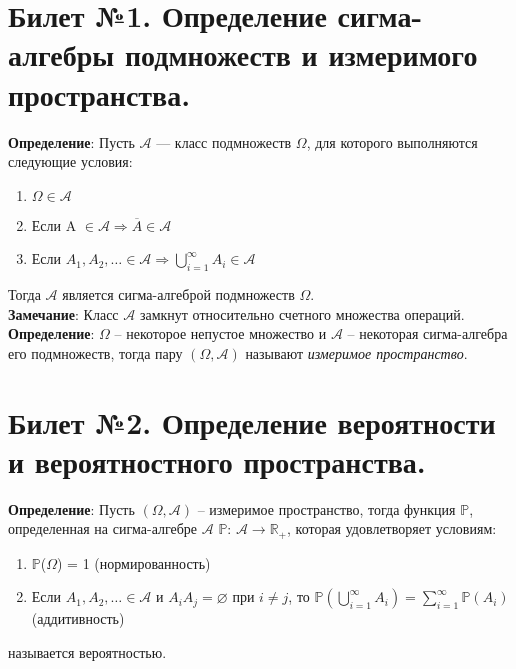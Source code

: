 




\newpage
\tableofcontents{} %
\newpage
	
\section{Билет №1. Определение сигма-алгебры подмножеств и измеримого пространства.}

\hspace*{\parindent} \textbf{Определение}:  Пусть $\mathscr{A}$ — класс подмножеств $\Omega$, для которого выполняются следующие условия:
\begin{enumerate}
	\item $\Omega \in \mathscr{A}$
	\item Если A $\in \mathscr{A} \Rightarrow \overline{A} \in \mathscr{A}$
	\item Если $A_1, A_2, \ldots \in \mathscr{A} \Rightarrow  \bigcup\limits_{i = 1}^{\infty} {A_i} \in \mathscr{A}$ 
\end{enumerate}
Тогда $\mathscr{A}$ является сигма-алгеброй подмножеств $\Omega$.\\

\textbf{Замечание}: Класс $\mathscr{A}$ замкнут относительно счетного множества операций.\\

\textbf{Определение}: $\Omega$ -- некоторое непустое множество и $\mathscr{A}$ -- некоторая сигма-алгебра его подмножеств, тогда пару $(\Omega, \mathscr{A})$ называют \textit{измеримое пространство}.\\

\section{Билет №2. Определение вероятности и вероятностного пространства.}

\hspace*{\parindent} \textbf{Определение}: Пусть $(\Omega, \mathscr{A})$ -- измеримое пространство, тогда функция $\mathbb{P}$, определенная на сигма-алгебре $\mathscr{A}$ $\mathbb{P}$: $\mathscr{A} \longrightarrow \mathbb{R}_{+}$, которая удовлетворяет условиям:
\begin{enumerate}
	\item $\mathbb{P}$($\Omega$) = 1 (нормированность)
	\item Если $A_1, A_2, \ldots \in \mathscr{A}$ и $A_i A_j = \varnothing$ при $i\neq j$, то $\mathbb{P}(\bigcup\limits_{i = 1}^{\infty} {A_i}) =  \sum\limits_{i = 1}^{\infty} {\mathbb{P}(A_i)}$ (аддитивность)
\end{enumerate}
называется вероятностью.\\

